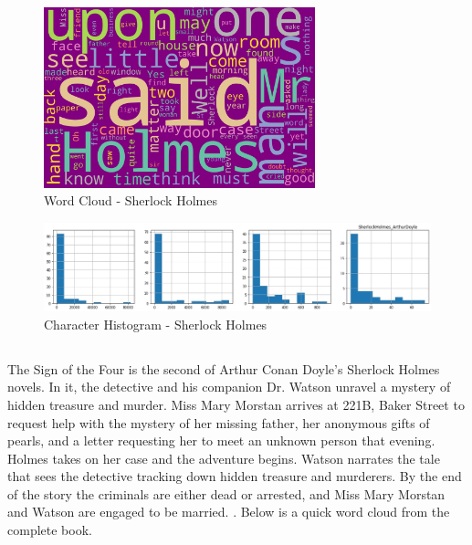 \begin{figure}[H]
	\begin{center}
		\includegraphics[width = 0.7\textwidth]{Images/SherlockHolmes_ArthurDoyle.jpeg} %
		\caption{Word Cloud - Sherlock Holmes}
		\label{fig:sherlock-holmes}
	\end{center}
\end{figure}

\begin{figure}[H]
	\begin{center}
		\includegraphics[width = 1.0\textwidth]{Images/char_hist_SherlockHolmes_ArthurDoyle.jpeg} %
		\caption{Character Histogram - Sherlock Holmes}
		\label{fig:histogram-sherlockholmes}
	\end{center}
\end{figure}

\subsection{\textcite{sign-of-the-four}} %
\label{sec:sign-of-the-four} %

The Sign of the Four is the second of Arthur Conan Doyle's Sherlock Holmes novels. In it, the detective and his companion Dr. Watson unravel a mystery of hidden treasure and murder. Miss Mary Morstan arrives at 221B, Baker Street to request help with the mystery of her missing father, her anonymous gifts of pearls, and a letter requesting her to meet an unknown person that evening. Holmes takes on her case and the adventure begins. Watson narrates the tale that sees the detective tracking down hidden treasure and murderers. By the end of the story the criminals are either dead or arrested, and Miss Mary Morstan and Watson are engaged to be married. \textcite{sign-of-the-four-summary}. Below is a quick word cloud from the complete book. 

